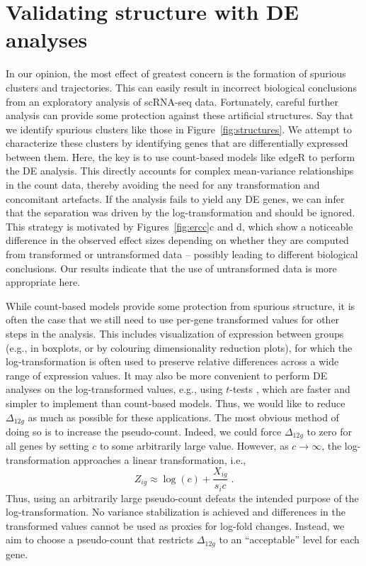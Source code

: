 \documentclass[10pt,letterpaper]{article}
\begin{document}
\section{Validating structure with DE analyses}
In our opinion, the most effect of greatest concern is the formation of spurious clusters and trajectories.
This can easily result in incorrect biological conclusions from an exploratory analysis of scRNA-seq data.
Fortunately, careful further analysis can provide some protection against these artificial structures.
Say that we identify spurious clusters like those in Figure~\ref{fig:structures}.
We attempt to characterize these clusters by identifying genes that are differentially expressed between them.
Here, the key is to use count-based models like edgeR \cite{robinson2010edgeR} to perform the DE analysis.
This directly accounts for complex mean-variance relationships in the count data, thereby avoiding the need for any transformation and concomitant artefacts.
If the analysis fails to yield any DE genes, we can infer that the separation was driven by the log-transformation and should be ignored.
This strategy is motivated by Figures~\ref{fig:ercc}c and d, which show a noticeable difference in the observed effect sizes depending on whether they are computed from transformed or untransformed data -- possibly leading to different biological conclusions.
Our results indicate that the use of untransformed data is more appropriate here.

While count-based models provide some protection from spurious structure, it is often the case that we still need to use per-gene transformed values for other steps in the analysis.
This includes visualization of expression between groups (e.g., in boxplots, or by colouring dimensionality reduction plots), for which the log-transformation is often used to preserve relative differences across a wide range of expression values.
It may also be more convenient to perform DE analyses on the log-transformed values, e.g., using $t$-tests \cite{law2014voom,soneson2018bias}, which are faster and simpler to implement than count-based models.
Thus, we would like to reduce $\Delta_{12g}$ as much as possible for these applications.
The most obvious method of doing so is to increase the pseudo-count.
Indeed, we could force $\Delta_{12g}$ to zero for all genes by setting $c$ to some arbitrarily large value.
However, as $c \to \infty$, the log-transformation approaches a linear transformation, i.e.,
\[
    Z_{ig} \approx \log(c) + \frac{X_{ig}}{s_i c} \;.
\]
Thus, using an arbitrarily large pseudo-count defeats the intended purpose of the log-transformation. 
No variance stabilization is achieved and differences in the transformed values cannot be used as proxies for log-fold changes. 
Instead, we aim to choose a pseudo-count that restricts $\Delta_{12g}$ to an ``acceptable'' level for each gene.
\end{document}
